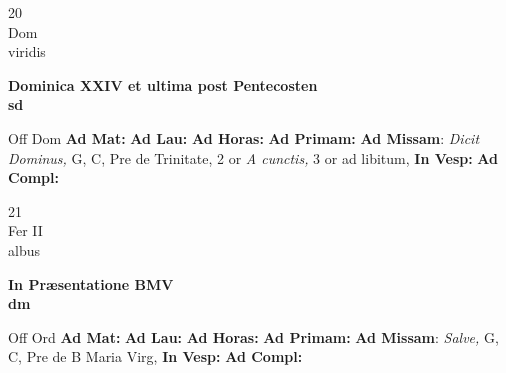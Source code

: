 \documentclass[10pt, openany]{book}
\begin{document}
    \begin{center}
        \begin{minipage}{3.5in}
            \vspace{2em}
            \begin{minipage}{0.5in}
                {\Huge 20} \\
                {\normalsize Dom} \\
                {\normalsize viridis}
            \end{minipage}
            \begin{minipage}{3.0in}
                \textbf{ \large Dominica XXIV et ultima post Pentecosten \\
                \textnormal{\normalsize sd}} \\ 
            \end{minipage}
            \begin{justify}Off Dom
                \textbf{Ad Mat: }
                \textbf{Ad Lau: }
                \textbf{Ad Horas: }
                \textbf{Ad Primam: }\textbf{Ad Missam}: \textit{Dicit Dominus,} G, C, Pre de Trinitate, 2 or \textit{A cunctis,} 3 or ad libitum,  
                \textbf{In Vesp: }
                \textbf{Ad Compl: }
            \end{justify}
        \end{minipage}
    \end{center}

    \begin{center}
        \begin{minipage}{3.5in}
            \vspace{2em}
            \begin{minipage}{0.5in}
                {\Huge 21} \\
                {\normalsize Fer II} \\
                {\normalsize albus}
            \end{minipage}
            \begin{minipage}{3.0in}
                \textbf{ \large In Præsentatione BMV \\
                \textnormal{\normalsize dm}} \\ 
            \end{minipage}
            \begin{justify}Off Ord
                \textbf{Ad Mat: }
                \textbf{Ad Lau: }
                \textbf{Ad Horas: }
                \textbf{Ad Primam: }\textbf{Ad Missam}: \textit{Salve,} G, C, Pre de B Maria Virg,  
                \textbf{In Vesp: }
                \textbf{Ad Compl: }
            \end{justify}
        \end{minipage}
    \end{center}
\end{document}
